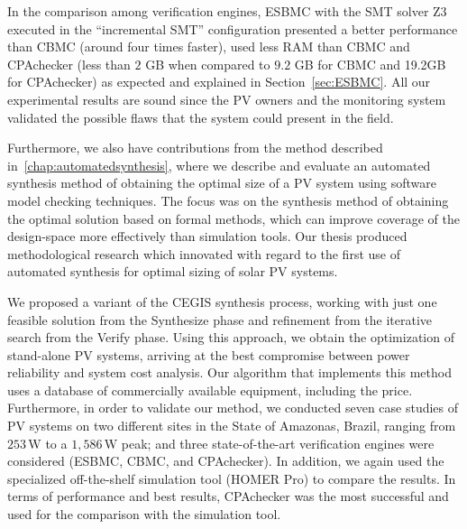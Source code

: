 %
In the comparison among verification engines, ESBMC with the SMT solver Z3 executed in the ``incremental SMT'' configuration presented a better performance than CBMC (around four times faster), used less RAM than CBMC and CPAchecker (less than $2$ GB when compared to $9.2$ GB for CBMC and 19.2GB for CPAchecker) as expected and explained in Section~\ref{sec:ESBMC}. All our experimental results are sound since the PV owners and the monitoring system validated the possible flaws that the system could present in the field.

Furthermore, we also have contributions from the method described in~\autoref{chap:automatedsynthesis}, where we describe and evaluate an automated synthesis method of obtaining the optimal size of a PV system using software model checking techniques. The focus was on the synthesis method of obtaining the optimal solution based on formal methods, which can improve coverage of the design-space more effectively than simulation tools. Our thesis produced methodological research which innovated with regard to the first use of automated synthesis for optimal sizing of solar PV systems.

We proposed a variant of the CEGIS synthesis process, working with just one feasible solution from the {\sc Synthesize} phase and refinement from the iterative search from the {\sc Verify} phase. Using this approach, we obtain the optimization of stand-alone PV systems, arriving at the best compromise between power reliability and system cost analysis. Our algorithm that implements this method uses a database of commercially available equipment, including the price. Furthermore, in order to validate our method, we conducted seven case studies of PV systems on two different sites in the State of Amazonas, Brazil, ranging from $253$\,W to a $1,586$\,W peak; and three state-of-the-art verification engines were considered (ESBMC, CBMC, and CPAchecker). In addition, we again used the specialized off-the-shelf simulation tool (HOMER Pro) to compare the results. In terms of performance and best results, CPAchecker was the most successful and used for the comparison with the simulation tool.

